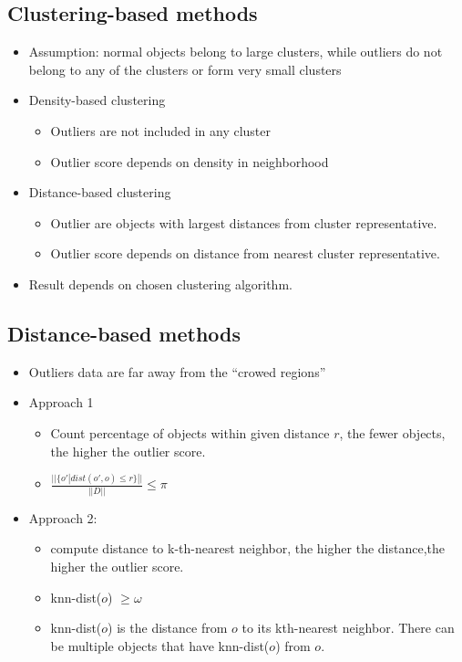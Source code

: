 \documentclass{article}
\begin{document}
\subsection{Clustering-based methods}
\begin{itemize}
  \item Assumption: normal objects belong to large clusters, while outliers do not belong to any of the clusters or form very small clusters
  
  \item Density-based clustering
  \begin{itemize}
    \item Outliers are not included in any cluster
    \item Outlier score depends on density in neighborhood
  \end{itemize}
  
  \item Distance-based clustering
  \begin{itemize}
    \item Outlier are objects with largest distances from cluster representative.
    \item Outlier score depends on distance from nearest cluster representative.
  \end{itemize}

  \item Result depends on chosen clustering algorithm.
\end{itemize}

\subsection{Distance-based methods}
\begin{itemize}
  \item Outliers data are far away from the ``crowed regions''

  \item Approach 1
  \begin{itemize}
    \item Count percentage of objects within given distance $r$, the fewer objects, the higher the outlier score.
    \item $\frac{||\{o' | dist(o', o) \le r\}||}{||D||} \le \pi$
  \end{itemize}
   
  \item Approach 2: 
  \begin{itemize}
    \item compute distance to k-th-nearest neighbor, the higher the distance,the higher the outlier score.
    \item knn-dist($o$) $\ge \omega$
    \item knn-dist($o$) is the distance from $o$ to its kth-nearest neighbor. There can be multiple objects that have knn-dist($o$) from $o$. 
  \end{itemize}
\end{itemize}
\end{document}
